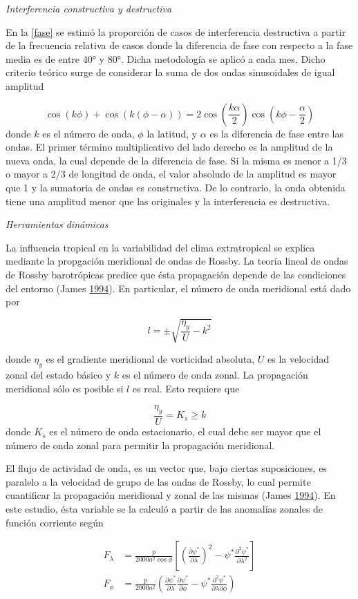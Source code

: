 \documentclass[spanish,a4paper,12p]{book}
\begin{document}
\emph{Interferencia constructiva y destructiva}

En la \autoref{fase} se estimó la proporción de casos de interferencia
destructiva a partir de la frecuencia relativa de casos donde la
diferencia de fase con respecto a la fase media es de entre 40° y 80°.
Dicha metodología se aplicó a cada mes. Dicho criterio teórico surge de
considerar la suma de dos ondas sinusoidales de igual amplitud

\[
\cos\left (k\phi \right) + \cos(k(\phi - \alpha)) = 2\cos\left( \frac{k\alpha}{2} \right)\cos\left( k\phi - \frac{\alpha}{2}\right) 
\] donde \(k\) es el número de onda, \(\phi\) la latitud, y \(\alpha\)
es la diferencia de fase entre las ondas. El primer término
multiplicativo del lado derecho es la amplitud de la nueva onda, la cual
depende de la diferencia de fase. Si la misma es menor a 1/3 o mayor a
2/3 de longitud de onda, el valor absoludo de la amplitud es mayor que 1
y la sumatoria de ondas es constructiva. De lo contrario, la onda
obtenida tiene una amplitud menor que las originales y la interferencia
es destructiva.

\emph{Herramientas dinámicas}

La influencia tropical en la variabilidad del clima extratropical se
explica mediante la propgación meridional de ondas de Rossby. La teoría
lineal de ondas de Rossby barotrópicas predice que ésta propagación
depende de las condiciones del entorno (James
\protect\hyperlink{ref-James}{1994}). En particular, el número de onda
meridional está dado por

\[
l = \pm \sqrt{\frac{\eta_{y}}{U} - k^2}
\]

donde \(\eta_{y}\) es el gradiente meridional de vorticidad absoluta,
\(U\) es la velocidad zonal del estado básico y \(k\) es el número de
onda zonal. La propagación meridional sólo es posible si \(l\) es real.
Esto requiere que

\[
\frac{\eta_{y}}{U} = K_s \ge k 
\] donde \(K_s\) es el número de onda estacionario, el cual debe ser
mayor que el número de onda zonal para permitir la propagación
meridional.

El flujo de actividad de onda, es un vector que, bajo ciertas
suposiciones, es paralelo a la velocidad de grupo de las ondas de
Rossby, lo cual permite cuantificar la propagación meridional y zonal de
las mismas (James \protect\hyperlink{ref-James}{1994}). En este estudio,
ésta variable se la calculó a partir de las anomalías zonales de función
corriente según

\[
\begin{aligned}
F_\lambda &= \frac{p}{2000a^2\cos\phi}\left[ \left( \frac{\partial \psi^*}{\partial \lambda} \right)^2 - \psi^*\frac{\partial^2 \psi^*}{\partial \lambda^2}  \right] \\
F_\phi &= \frac{p}{2000a^2} \left( \frac{\partial \psi^*}{\partial \lambda}\frac{\partial \psi^*}{\partial \phi}  - \psi^* \frac{\partial^2 \psi^*}{\partial \lambda \partial \phi} \right) 
\end{aligned}
\]
\end{document}
